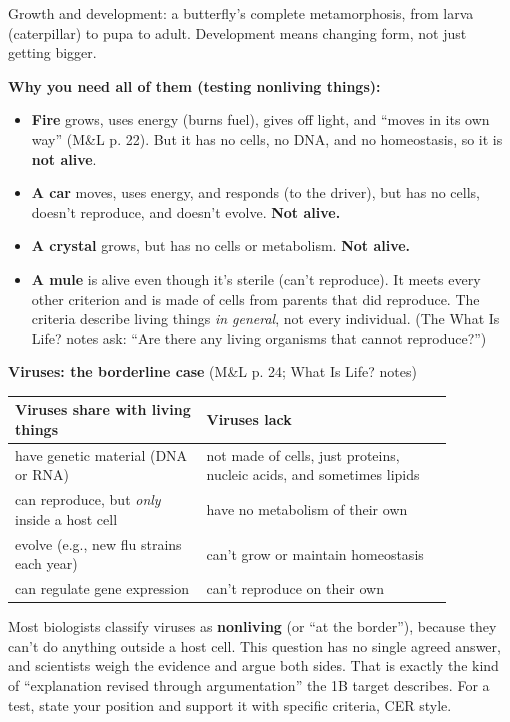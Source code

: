 \documentclass[11pt,letterpaper]{article}
\begin{document}
  {Growth and development: a butterfly's complete metamorphosis, from larva (caterpillar) to pupa to adult. Development means changing form, not just getting bigger.}

\textbf{Why you need all of them (testing nonliving things):}
\begin{itemize}
  \item \textbf{Fire} grows, uses energy (burns fuel), gives off light, and ``moves in its own way'' (M\&L p. 22). But it has no cells, no DNA, and no homeostasis, so it is \textbf{not alive}.
  \item \textbf{A car} moves, uses energy, and responds (to the driver), but has no cells, doesn't reproduce, and doesn't evolve. \textbf{Not alive.}
  \item \textbf{A crystal} grows, but has no cells or metabolism. \textbf{Not alive.}
  \item \textbf{A mule} is alive even though it's sterile (can't reproduce). It meets every other criterion and is made of cells from parents that did reproduce. The criteria describe living things \emph{in general}, not every individual. (The What Is Life? notes ask: ``Are there any living organisms that cannot reproduce?'')
\end{itemize}


\textbf{Viruses: the borderline case} (M\&L p. 24; What Is Life? notes)

\begin{longtable}{@{}>{\raggedright\arraybackslash}p{0.38\linewidth}>{\raggedright\arraybackslash}p{0.49\linewidth}@{}}
\toprule
Viruses share with living things & Viruses lack \\
\midrule
\endhead
have genetic material (DNA or RNA) & not made of cells, just proteins, nucleic acids, and sometimes lipids \\
can reproduce, but \emph{only} inside a host cell & have no metabolism of their own \\
evolve (e.g., new flu strains each year) & can't grow or maintain homeostasis \\
can regulate gene expression & can't reproduce on their own \\
\bottomrule
\end{longtable}

Most biologists classify viruses as \textbf{nonliving} (or ``at the border''), because they can't do anything outside a host cell. This question has no single agreed answer, and scientists weigh the evidence and argue both sides. That is exactly the kind of ``explanation revised through argumentation'' the 1B target describes. For a test, state your position and support it with specific criteria, CER style.
\end{document}
